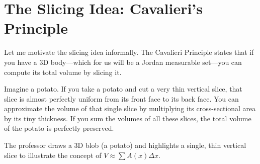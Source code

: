 \section{The Slicing Idea: Cavalieri's Principle}

\begin{spoken_clean}[00:40:07 - 00:42:00]
Let me motivate the slicing idea informally. The Cavalieri Principle states that if you have a 3D body—which for us will be a Jordan measurable set—you can compute its total volume by slicing it. 

Imagine a potato. If you take a potato and cut a very thin vertical slice, that slice is almost perfectly uniform from its front face to its back face. You can approximate the volume of that single slice by multiplying its cross-sectional area by its tiny thickness. If you sum the volumes of all these slices, the total volume of the potato is perfectly preserved.
\end{spoken_clean}

\begin{nice-box}
The professor draws a 3D blob (a potato) and highlights a single, thin vertical slice to illustrate the concept of $V \approx \sum A(x) \Delta x$.
\end{nice-box}

\begin{math_stroke}
\begin{center}
\end{center}
\end{math_stroke}


